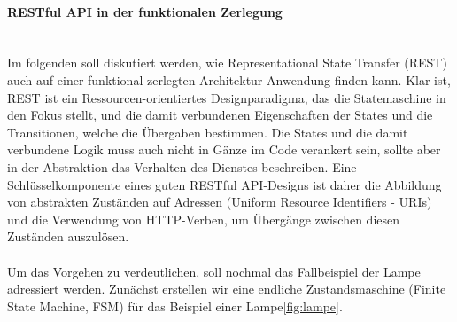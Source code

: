 \documentclass[../vs-script-first-v01.tex]{subfiles}
\begin{document}
\paragraph{RESTful API in der funktionalen Zerlegung\\\\}
Im folgenden soll diskutiert werden, wie Representational State Transfer (REST) auch auf einer funktional zerlegten Architektur Anwendung finden kann.  Klar ist, REST ist ein Ressourcen-orientiertes Designparadigma, das die Statemaschine in den Fokus stellt, und die damit verbundenen Eigenschaften der States und die Transitionen, welche die Übergaben bestimmen. Die States und die damit verbundene Logik muss auch nicht in Gänze im Code verankert sein, sollte aber in der Abstraktion das Verhalten des Dienstes beschreiben. Eine Schlüsselkomponente eines guten RESTful API-Designs ist daher die Abbildung von abstrakten Zuständen auf Adressen (Uniform Resource Identifiers - URIs) und die Verwendung von HTTP-Verben, um Übergänge zwischen diesen Zuständen auszulösen. 
\\\\
Um das Vorgehen zu verdeutlichen, soll nochmal das Fallbeispiel der Lampe adressiert werden. Zunächst erstellen wir eine endliche Zustandsmaschine (Finite State Machine, FSM) für das Beispiel einer Lampe\ref{fig:lampe}.
\end{document}
